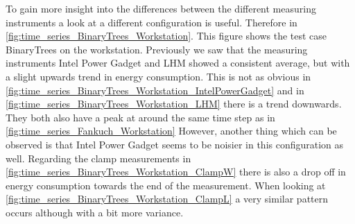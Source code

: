 

To gain more insight into the differences between the different measuring instruments a look at a different configuration is useful. Therefore in \cref{fig:time_series_BinaryTrees_Workstation}. This figure shows the test case BinaryTrees on the workstation. Previously we saw that the measuring instruments Intel Power Gadget and LHM showed a consistent average, but with a slight upwards trend in energy consumption. This is not as obvious in \cref{fig:time_series_BinaryTrees_Workstation_IntelPowerGadget} and in \cref{fig:time_series_BinaryTrees_Workstation_LHM} there is a trend downwards. They both also have a peak at around the same time step as in \cref{fig:time_series_Fankuch_Workstation}
However, another thing which can be observed is that Intel Power Gadget seems to be noisier in this configuration as well.  Regarding the clamp measurements in \cref{fig:time_series_BinaryTrees_Workstation_ClampW} there is also a drop off in energy consumption towards the end of the measurement. When looking at \cref{fig:time_series_BinaryTrees_Workstation_ClampL} a very similar pattern occurs although with a bit more variance. 












